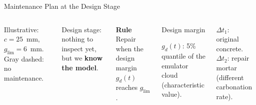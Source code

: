 \begin{frame}{Maintenance Plan at the Design Stage}
\begin{columns}[c,onlytextwidth]
{\scriptsize Illustrative: $c = 25$~mm, $g_\mathrm{lim} = 6$~mm. Gray dashed: no maintenance.}

\raggedright
Design stage: nothing to inspect yet, but we \textbf{know the model}.

\vspace{0.2cm}

\textbf{Rule}\\
Repair when the design margin $g_d(t)$ reaches $g_\mathrm{lim}$.

\vspace{0.2cm}

\begin{exampleblock}{Design margin}
\raggedright
$g_d(t)$: 5\% quantile of the emulator cloud (characteristic value).
\end{exampleblock}

\vspace{0.1cm}

{\small $\Delta t_1$: original concrete.\\
$\Delta t_2$: repair mortar (different carbonation rate).}

\end{columns}

\end{frame}
